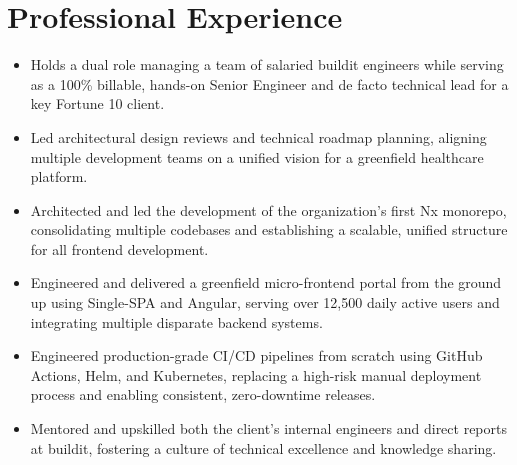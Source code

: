 \section*{Professional Experience}

\begin{itemize}
    \item Holds a dual role managing a team of salaried buildit engineers while serving as a 100\% billable, hands-on Senior Engineer and de facto technical lead for a key Fortune 10 client.
    \item Led architectural design reviews and technical roadmap planning, aligning multiple development teams on a unified vision for a greenfield healthcare platform.
    \item Architected and led the development of the organization's first Nx monorepo, consolidating multiple codebases and establishing a scalable, unified structure for all frontend development.
    \item Engineered and delivered a greenfield micro-frontend portal from the ground up using Single-SPA and Angular, serving over 12,500 daily active users and integrating multiple disparate backend systems.
    \item Engineered production-grade CI/CD pipelines from scratch using GitHub Actions, Helm, and Kubernetes, replacing a high-risk manual deployment process and enabling consistent, zero-downtime releases.
    \item Mentored and upskilled both the client's internal engineers and direct reports at buildit, fostering a culture of technical excellence and knowledge sharing.
\end{itemize}
\vspace{\spacingBetweenJobs}

